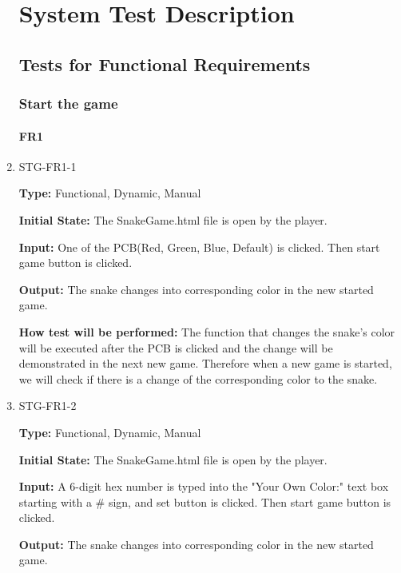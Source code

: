 \documentclass[12pt, titlepage]{article}
\begin{document}
\begin{enumerate}
\setcounter{secnumdepth}{4}
\section{System Test Description}
	
\subsection{Tests for Functional Requirements}

\subsubsection{Start the game}



\paragraph{FR1}
\item{STG-FR1-1\\}

\textbf{Type:} Functional, Dynamic, Manual

\textbf{Initial State:} The SnakeGame.html file is open by the player.

\textbf{Input:} One of the PCB(Red, Green, Blue, Default) is clicked. Then start game button is clicked.

\textbf{Output:} The snake changes into corresponding color in the new started game.

\textbf{How test will be performed:} The function that changes the snake's color will be executed after the PCB is clicked and the change will be demonstrated in the next new game. Therefore when a new game is started, we will check if there is a change of the corresponding color to the snake.

\item{STG-FR1-2\\}

\textbf{Type:} Functional, Dynamic, Manual

\textbf{Initial State:} The SnakeGame.html file is open by the player.

\textbf{Input:} A 6-digit hex number is typed into the "Your Own Color:" text box starting with a \# sign, and set button is clicked. Then start game button is clicked.

\textbf{Output:} The snake changes into corresponding color in the new started game.


\end{enumerate}
\end{document}
